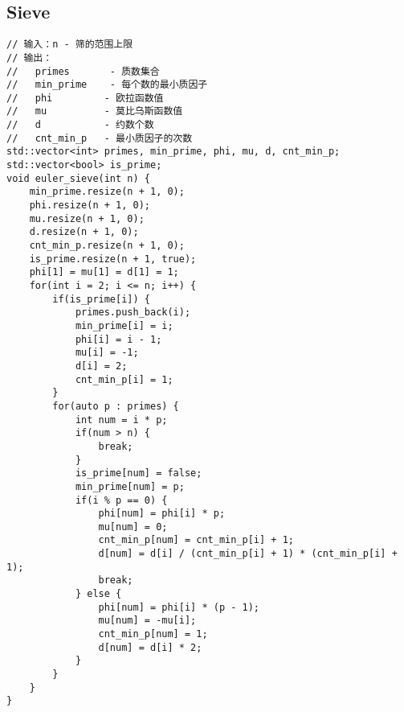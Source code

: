 \subsection{Sieve}
\begin{lstlisting}
// 输入：n - 筛的范围上限
// 输出：
//   primes       - 质数集合
//   min_prime    - 每个数的最小质因子
//   phi         - 欧拉函数值
//   mu          - 莫比乌斯函数值
//   d           - 约数个数
//   cnt_min_p   - 最小质因子的次数
std::vector<int> primes, min_prime, phi, mu, d, cnt_min_p;
std::vector<bool> is_prime;
void euler_sieve(int n) {
    min_prime.resize(n + 1, 0);
    phi.resize(n + 1, 0);
    mu.resize(n + 1, 0);
    d.resize(n + 1, 0);
    cnt_min_p.resize(n + 1, 0);
    is_prime.resize(n + 1, true);
    phi[1] = mu[1] = d[1] = 1;
    for(int i = 2; i <= n; i++) {
        if(is_prime[i]) {
            primes.push_back(i);
            min_prime[i] = i;
            phi[i] = i - 1;
            mu[i] = -1;
            d[i] = 2;
            cnt_min_p[i] = 1;
        }
        for(auto p : primes) {
            int num = i * p;
            if(num > n) {
                break;
            }
            is_prime[num] = false;
            min_prime[num] = p;
            if(i % p == 0) {
                phi[num] = phi[i] * p;
                mu[num] = 0;
                cnt_min_p[num] = cnt_min_p[i] + 1;
                d[num] = d[i] / (cnt_min_p[i] + 1) * (cnt_min_p[i] + 1);
                break;
            } else {
                phi[num] = phi[i] * (p - 1);
                mu[num] = -mu[i];
                cnt_min_p[num] = 1;
                d[num] = d[i] * 2;
            }
        }
    }
}
\end{lstlisting}

